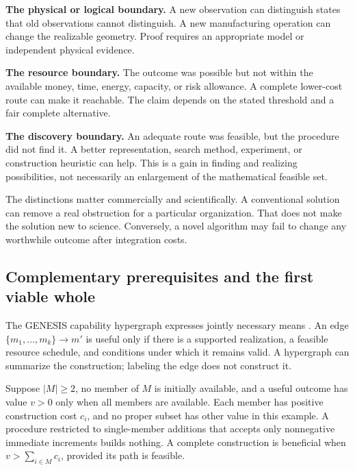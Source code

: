 \textbf{The physical or logical boundary.} A new observation can distinguish states that old observations cannot distinguish. A new manufacturing operation can change the realizable geometry. Proof requires an appropriate model or independent physical evidence.

\textbf{The resource boundary.} The outcome was possible but not within the available money, time, energy, capacity, or risk allowance. A complete lower-cost route can make it reachable. The claim depends on the stated threshold and a fair complete alternative.

\textbf{The discovery boundary.} An adequate route was feasible, but the procedure did not find it. A better representation, search method, experiment, or construction heuristic can help. This is a gain in finding and realizing possibilities, not necessarily an enlargement of the mathematical feasible set.

The distinctions matter commercially and scientifically. A conventional solution can remove a real obstruction for a particular organization. That does not make the solution new to science. Conversely, a novel algorithm may fail to change any worthwhile outcome after integration costs.

\subsection{Complementary prerequisites and the first viable whole}

The GENESIS capability hypergraph expresses jointly necessary means \citep{boucherGenesis}. An edge $\{m_1,\ldots,m_k\}\rightarrow m'$ is useful only if there is a supported realization, a feasible resource schedule, and conditions under which it remains valid. A hypergraph can summarize the construction; labeling the edge does not construct it.

\begin{proposition}
\label{prop:complementarity}
Suppose $|M|\ge2$, no member of $M$ is initially available, and a useful outcome has value $v>0$ only when all members are available. Each member has positive construction cost $c_i$, and no proper subset has other value in this example. A procedure restricted to single-member additions that accepts only nonnegative immediate increments builds nothing. A complete construction is beneficial when $v>\sum_{i\in M}c_i$, provided its path is feasible.
\end{proposition}


